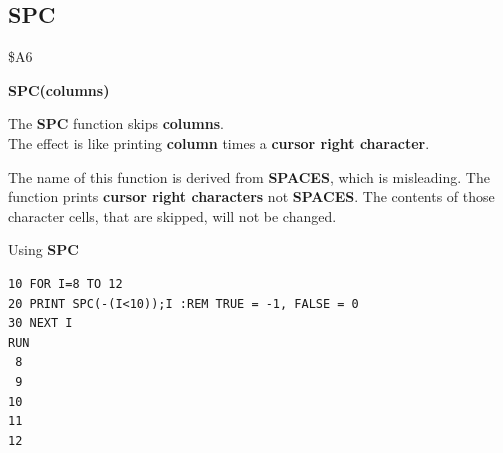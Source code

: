 
\newpage
\subsection{SPC}
\begin{description}[leftmargin=2cm,style=nextline]
\item [Token:] \$A6
\item [Format:] {\bf SPC(columns)}
\item [Usage:] The {\bf SPC} function skips {\bf columns}. \\
               The effect is like printing {\bf column}
               times a {\bf cursor right character}.

\item [Remarks:] The name of this function is derived from
                 {\bf SPACES}, which is misleading.
                 The function prints {\bf cursor right characters}
                 not {\bf SPACES}. The contents of those character
                 cells, that are skipped, will not be changed.

\item [Example:] Using {\bf SPC}
\begin{tcolorbox}[colback=black,coltext=white]
\verbatimfont{\codefont}
\begin{verbatim}
10 FOR I=8 TO 12
20 PRINT SPC(-(I<10));I :REM TRUE = -1, FALSE = 0
30 NEXT I
RUN
 8
 9
10
11
12
\end{verbatim}
\end{tcolorbox}
\end{description}


\newpage
